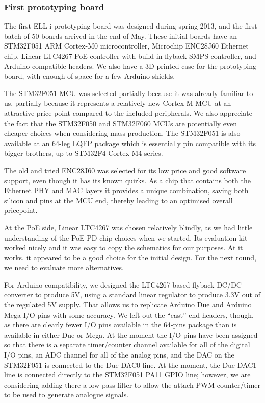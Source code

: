 \documentclass[draft,a4paper]{siamltex}
\begin{document}
\subsubsection{First prototyping board}

The first ELL-i prototyping board was designed during spring 2013, and
the first batch of 50 boards arrived in the end of May.  These initial
boards have an STM32F051\cite{STM32F051} ARM Cortex-M0
microcontroller, Microchip ENC28J60\cite{ENC28J60} Ethernet chip,
Linear LTC4267 PoE controller with build-in flyback SMPS controller,
and Arduino-compatible headers.  We also have a 3D printed case for
the prototyping board, with enough of space for a few Arduino shields.

The STM32F051 MCU was selected partially because it was already
familiar to us, partially because it represents a relatively new
Cortex-M MCU at an attractive price point compared to the included
peripherals.  We also appreciate the fact that the STM32F050 and
STM32F060 MCUs are potentially even cheaper choices when considering
mass production.  The STM32F051 is also available at an 64-leg LQFP
package which is essentially pin compatible with its bigger brothers,
up to STM32F4 Cortex-M4 series.

The old and tried ENC28J60 was selected for its low price and good
software support, even though it has its known quirks.  As a chip that
contains both the Ethernet PHY and MAC layers it provides a unique
combination, saving both silicon and pins at the MCU end, thereby
leading to an optimised overall pricepoint.

At the PoE side, Linear LTC4267 was chosen relatively blindly, as we
had little understanding of the PoE PD chip choices when we started.
Its evaluation kit worked nicely and it was easy to copy the
schematics for our purposes.  At it works, it appeared to be a good
choice for the initial design.  For the next round, we need to
evaluate more alternatives.

For Arduino-compatibility, we designed the LTC4267-based flyback DC/DC
converter to produce 5V, using a standard linear regulator to produce
3.3V out of the regulated 5V supply.  That allows us to replicate
Arduino Due and Arduino Mega I/O pins with some accuracy.  We left out
the ``east'' end headers, though, as there are clearly fewer I/O pins
available in the 64-pins package than is available in either Due or
Mega.  At the moment the I/O pins have been assigned so that there is
a separate timer/counter channel available for all of the digital I/O
pins, an ADC channel for all of the analog pins, and the DAC on the
STM32F051 is connected to the Due DAC0 line.  At the moment, the Due
DAC1 line is connected directly to the STM32F051 PA11 GPIO line;
however, we are considering adding there a low pass filter to allow
the attach PWM counter/timer to be used to generate analogue signals.
\end{document}
